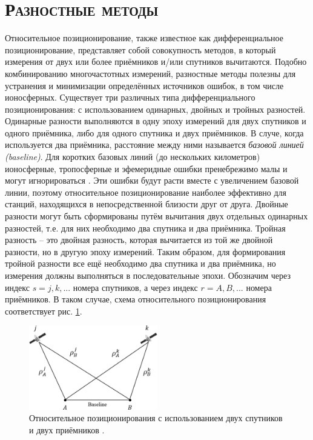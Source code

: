 \section{\textsc{Разностные методы}}

Относительное позиционирование, также известное как дифференциальное позиционирование, представляет собой совокупность методов, в который измерения от двух или более приёмников и/или спутников вычитаются. 
Подобно комбинированию многочастотных измерений, разностные методы полезны для устранения и минимизации определённых источников ошибок, в том числе ионосферных.
Существует три различных типа дифференциального позиционирования: с использованием одинарных, двойных и тройных разностей. 
Одинарные разности выполняются в одну эпоху измерений для двух спутников и одного приёмника, либо для одного спутника и двух приёмников.
В случе, когда используется два приёмника, расстояние между ними называется \textit{базовой линией (baseline)}.
Для коротких базовых линий (до нескольких километров) ионосферные, тропосферные и эфемеридные ошибки пренебрежимо малы и могут игнорироваться \cite{Seeber2003}. 
Эти ошибки будут расти вместе с увеличением базовой линии, поэтому относительное позиционирование наиболее эффективно для станций, находящихся в непосредственной близости друг от друга.
Двойные разности могут быть сформированы путём вычитания двух отдельных одинарных разностей, т.е. для них необходимо два спутника и два приёмника. 
Тройная разность -- это двойная разность, которая вычитается из той же двойной разности, но в другую эпоху измерений.
Таким образом, для формирования тройной разности все ещё необходимо два спутника и два приёмника, но измерения должны выполняться в последовательные эпохи.
Обозначим через индекс $s=j,k,...$ номера спутников, а через индекс $r=A,B,...$ номера приёмников. 
В таком случае, схема относительного позиционирования соответствует рис. \ref{fig-relative-pos}.
\begin{figure}[h]
\centering    
\includegraphics[width=0.5\textwidth]{fig/relative-pos.png}    
\caption{Относительное позиционирования с использованием двух спутников и двух приёмников \cite{Seeber2003}.}
\label{fig-relative-pos}      
\end{figure}  

